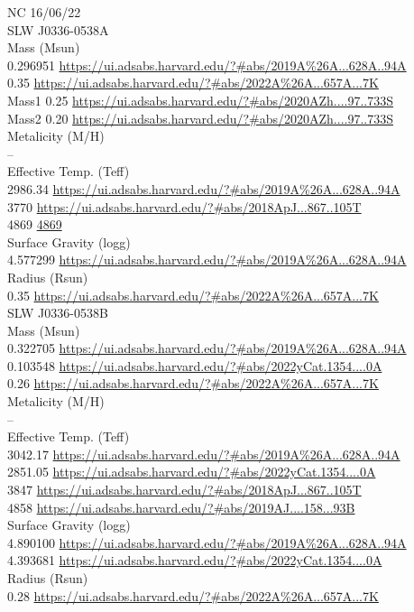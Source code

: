 NC 16/06/22\\
SLW J0336-0538A\\
Mass (Msun)\\
0.296951 \url{https://ui.adsabs.harvard.edu/?#abs/2019A%26A...628A..94A}\\
0.35 \url{https://ui.adsabs.harvard.edu/?#abs/2022A%26A...657A...7K}\\
Mass1 0.25 \url{https://ui.adsabs.harvard.edu/?#abs/2020AZh....97..733S}\\
Mass2 0.20 \url{https://ui.adsabs.harvard.edu/?#abs/2020AZh....97..733S}\\
Metalicity (M/H)\\
--\\
Effective Temp. (Teff)\\
2986.34 \url{https://ui.adsabs.harvard.edu/?#abs/2019A%26A...628A..94A}\\
3770 \url{https://ui.adsabs.harvard.edu/?#abs/2018ApJ...867..105T}\\
4869 \url{4869}\\
Surface Gravity (logg)\\
4.577299 \url{https://ui.adsabs.harvard.edu/?#abs/2019A%26A...628A..94A}\\
Radius (Rsun)\\
0.35 \url{https://ui.adsabs.harvard.edu/?#abs/2022A%26A...657A...7K}\\

SLW J0336-0538B \\

Mass (Msun)\\
0.322705 \url{https://ui.adsabs.harvard.edu/?#abs/2019A%26A...628A..94A}\\
0.103548 \url{https://ui.adsabs.harvard.edu/?#abs/2022yCat.1354....0A}\\
0.26 \url{https://ui.adsabs.harvard.edu/?#abs/2022A%26A...657A...7K}\\
Metalicity (M/H)\\
--\\
Effective Temp. (Teff)\\
3042.17 \url{https://ui.adsabs.harvard.edu/?#abs/2019A%26A...628A..94A}\\
2851.05 \url{https://ui.adsabs.harvard.edu/?#abs/2022yCat.1354....0A}\\
3847 \url{https://ui.adsabs.harvard.edu/?#abs/2018ApJ...867..105T}\\
4858 \url{https://ui.adsabs.harvard.edu/?#abs/2019AJ....158...93B}\\
Surface Gravity (logg)\\
4.890100 \url{https://ui.adsabs.harvard.edu/?#abs/2019A%26A...628A..94A}\\
4.393681 \url{https://ui.adsabs.harvard.edu/?#abs/2022yCat.1354....0A}\\

Radius (Rsun)\\
0.28 \url{https://ui.adsabs.harvard.edu/?#abs/2022A%26A...657A...7K}\\